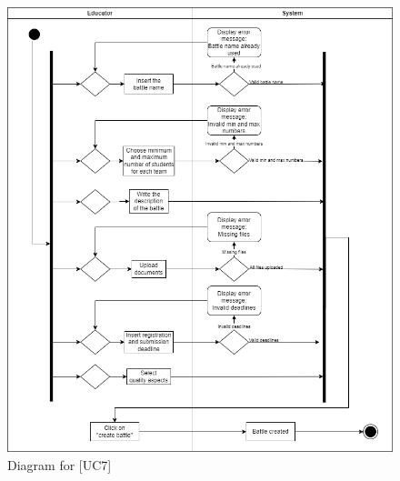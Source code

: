 \documentclass[12pt,oneside,a4paper]{article}
\begin{document}
\begin{figure}
    \centering
    \includegraphics[width=1\linewidth]{Images//Diagrams/EducatorCreatesBattle.png}
    \caption{Diagram for [UC7]}
    \label{fig:enter-label}
\end{figure}

\pagebreak
\end{document}
